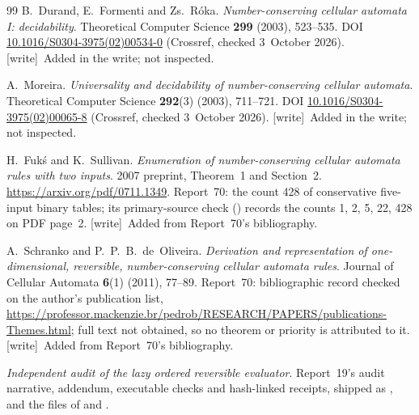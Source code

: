 \documentclass[11pt,a4paper]{article}
\numberwithin{equation}{section}
\newcommand{\wtag}{\textup{[write]}}
\begin{document}
\begin{thebibliography}{99}
B.~Durand, E.~Formenti and Zs.~R\'oka. \emph{Number-conserving cellular automata I: decidability}. Theoretical Computer Science \textbf{299} (2003), 523--535. DOI \href{https://doi.org/10.1016/S0304-3975(02)00534-0}{10.1016/S0304-3975(02)00534-0} (Crossref, checked 3~October 2026). \wtag\ Added in the write; not inspected.

A.~Moreira. \emph{Universality and decidability of number-conserving cellular automata}. Theoretical Computer Science \textbf{292}(3) (2003), 711--721. DOI \href{https://doi.org/10.1016/S0304-3975(02)00065-8}{10.1016/S0304-3975(02)00065-8} (Crossref, checked 3~October 2026). \wtag\ Added in the write; not inspected.

H.~Fuk\'s and K.~Sullivan. \emph{Enumeration of number-conserving cellular automata rules with two inputs}. 2007 preprint, Theorem~1 and Section~2. \url{https://arxiv.org/pdf/0711.1349}. Report~70: the count 428 of conservative five-input binary tables; its primary-source check () records the counts 1, 2, 5, 22, 428 on PDF page~2. \wtag\ Added from Report~70's bibliography.

A.~Schranko and P.~P.~B.~de~Oliveira. \emph{Derivation and representation of one-dimensional, reversible, number-conserving cellular automata rules}. Journal of Cellular Automata \textbf{6}(1) (2011), 77--89. Report~70: bibliographic record checked on the author's publication list, \url{https://professor.mackenzie.br/pedrob/RESEARCH/PAPERS/publications-Themes.html}; full text not obtained, so no theorem or priority is attributed to it. \wtag\ Added from Report~70's bibliography.

\emph{Independent audit of the lazy ordered reversible evaluator}. Report~19's audit narrative, addendum, executable checks and hash-linked receipts, shipped as ,  and the  files of  and .
\end{thebibliography}
\end{document}
